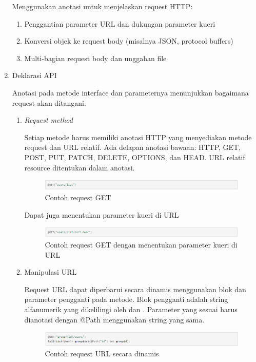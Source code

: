 \begin{enumerate}
Menggunakan anotasi untuk menjelaskan request HTTP:
	\begin{enumerate}
		\item Penggantian parameter URL dan dukungan parameter kueri
		\item Konversi objek ke request body (misalnya JSON, protocol buffers)
		\item Multi-bagian request body dan unggahan file
	\end{enumerate}
	
\item Deklarasi API

Anotasi pada metode interface dan parameternya menunjukkan bagaimana request akan ditangani.
	\begin{enumerate}
	\item \emph{Request method}
	
	Setiap metode harus memiliki anotasi HTTP yang menyediakan metode request dan URL relatif. Ada delapan anotasi bawaan: HTTP, GET, POST, PUT, PATCH, DELETE, OPTIONS, dan HEAD. URL relatif resource ditentukan dalam anotasi.
	\begin{figure}[H]
		\centering
		\includegraphics[keepaspectratio, width=12cm]{gambar/retrofit4}
		\caption{Contoh request GET \citep{retrofit2023}}
		\label{gambar:gambar_52}
	\end{figure}
	
	Dapat juga menentukan parameter kueri di URL
	\begin{figure}[H]
		\centering
		\includegraphics[keepaspectratio, width=12cm]{gambar/retrofit5}
		\caption{Contoh request GET dengan menentukan parameter kueri di URL \citep{retrofit2023}}
		\label{gambar:gambar_53}
	\end{figure}
	
	\item Manipulasi URL
	
	Request URL dapat diperbarui secara dinamis menggunakan blok dan parameter pengganti pada metode. Blok pengganti adalah string alfanumerik yang dikelilingi oleh { dan }. Parameter yang sesuai harus dianotasi dengan @Path menggunakan string yang sama.
	\begin{figure}[H]
		\centering
		\includegraphics[keepaspectratio, width=12cm]{gambar/retrofit6}
		\caption{Contoh request URL secara dinamis \citep{retrofit2023}}
		\label{gambar:gambar_54}
	\end{figure}
	

\end{enumerate}
\end{enumerate}
